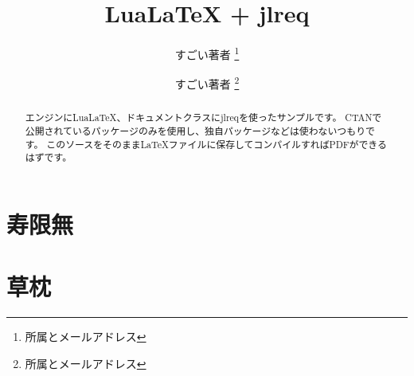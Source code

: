 \documentclass[article, line_length=40zw, head_space=30mm, foot_space=30mm, gutter=30mm]{jlreq}
\title{LuaLaTeX + jlreq}
\author{すごい著者 \thanks{所属とメールアドレス} \and すごい著者 \thanks{所属とメールアドレス}}
\begin{document}
\maketitle

\begin{abstract}
エンジンにLuaLaTeX、ドキュメントクラスにjlreqを使ったサンプルです。
CTANで公開されているパッケージのみを使用し、独自パッケージなどは使わないつもりです。
このソースをそのままLaTeXファイルに保存してコンパイルすればPDFができるはずです。
\end{abstract}

\section{寿限無}


\section{草枕}


\newpage
\layout
\end{document}
